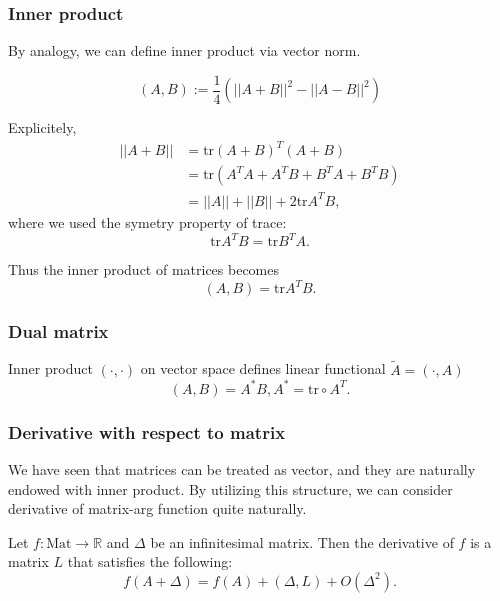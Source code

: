\documentclass[dvipdfmx,cjk]{beamer}
\theoremstyle{example}
\newcommand{\tr}{\text{tr}}
\newcommand{\transpose}[1]{{#1}^T}
\newcommand{\norm}[1]{||{#1}||}
\newcommand{\dual}[1]{{#1}^{*}}
\newcommand{\reals}{\mathbb{R}}
\begin{document}
\begin{frame}
    \frametitle{Inner product}

    By analogy, we can define inner product via vector norm.

    \begin{equation}
        (A, B) := \frac{1}{4}\left(\norm{A + B}^2 - \norm{A - B}^2 \right)
    \end{equation}

    Explicitely,
    \begin{align}
        \norm{A + B} &= \tr \transpose{\left( A+B\right)} \left( A+B\right) \\
        &= \tr \left(\transpose{A} A + \transpose{A} B + \transpose{B} A + \transpose{B} B \right) \\
        &= \norm{A} + \norm{B} + 2 \tr \transpose{A} B,
    \end{align}
    where we used the symetry property of trace:
    \begin{equation}
        \tr \transpose{A} B = \tr \transpose{B} A.
    \end{equation}

    Thus the inner product of matrices becomes
    \begin{equation}
        \left(A, B\right) = \tr \transpose{A} B.
    \end{equation}

    
\end{frame}

\begin{frame}
    \frametitle{Dual matrix}

    Inner product $(\cdot, \cdot)$ on vector space defines linear functional $\tilde{A} = (\cdot, A)$
    \begin{equation}
        (A, B) = \dual{A} B, \dual{A} = \tr \circ \transpose{A}.
    \end{equation}

\end{frame}

\begin{frame}
    \frametitle{Derivative with respect to matrix}

    We have seen that matrices can be treated as vector, and they are naturally endowed with inner product.
    By utilizing this structure, we can consider derivative of matrix-arg function quite naturally.

    Let $f: \text{Mat} \to \reals$ and $\Delta$ be an infinitesimal matrix. Then the derivative of $f$ is a matrix $L$ that satisfies the following:
    \begin{equation}
        f(A + \Delta) = f(A)  + (\Delta, L) + O(\Delta^2).
    \end{equation}

\end{frame}
\end{document}
